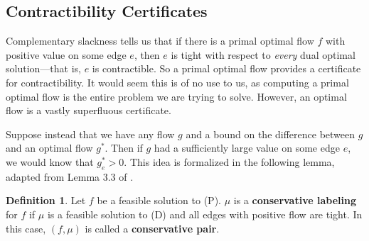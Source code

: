\documentclass[11pt]{article}
\theoremstyle{definition}
\newtheorem{definition}{Definition}[section]
\theoremstyle{definition}
\theoremstyle{definition}
\begin{document}
	\subsection{Contractibility Certificates} \label{sec:cert-contract}
	Complementary slackness tells us that if there is a primal optimal flow
	$f$ with positive value
	on some edge $e$, then $e$ is tight with respect to \emph{every} dual
	optimal solution---that
	is, $e$ is contractible. So a primal optimal flow provides a certificate
	for contractibility.
	It would seem this is of no use to us, as computing a primal optimal flow is the entire
	problem we are trying to solve. However,
	an optimal flow is a vastly superfluous certificate.
	
	Suppose instead that we have any flow $g$ and a bound on the difference
	between $g$ and an optimal
	flow $g^*$. Then if $g$ had a sufficiently large value on some edge $e$, we would know that
	$g^*_e > 0$. This idea is formalized in the following lemma, adapted from Lemma 3.3 of
	\cite{Olver2017}.
	
  	\begin{definition} \label{def:conservative}
  	Let $f$ be a feasible solution to (P).
	$\mu$ is a \textbf{conservative labeling} for $f$ if $\mu$ is
	a feasible solution to (D) and all edges with positive flow are tight. In this case,
	$(f, \mu)$ is called a \textbf{conservative pair}.
	\end{definition}
\end{document}
